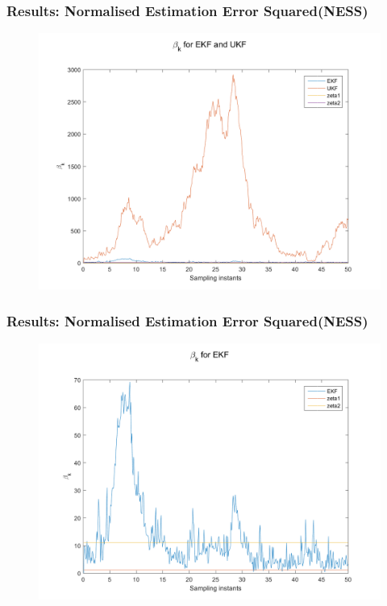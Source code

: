 \documentclass{beamer}
\begin{document}
\begin{frame}
\frametitle{Results: Normalised Estimation Error Squared(NESS)}
\begin{figure}
\includegraphics[width=0.8\linewidth]{plots/betak_noKF.png}
\end{figure}
\end{frame}
\begin{frame}
\frametitle{Results: Normalised Estimation Error Squared(NESS)}
\begin{figure}
\includegraphics[width=0.8\linewidth]{plots/betak_EKF.png}
\end{figure}
\end{frame}
\end{document}

